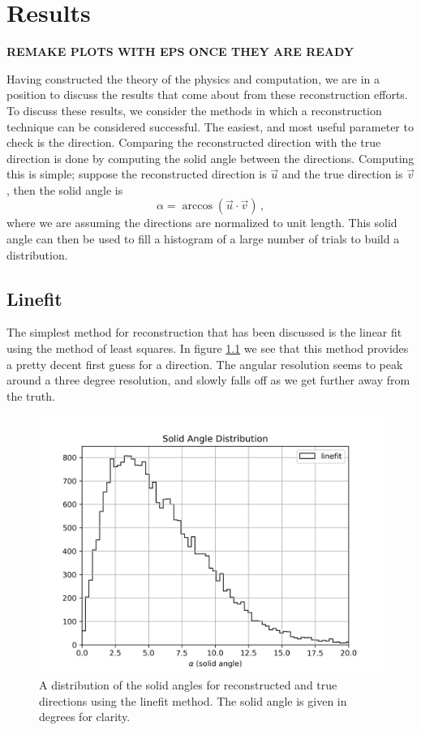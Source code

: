 \chapter{Results}

\textbf{REMAKE PLOTS WITH EPS ONCE THEY ARE READY}

Having constructed the theory of the physics and computation, we are in a position to discuss the results that come about from these reconstruction efforts. To discuss these results, we consider the methods in which a reconstruction technique can be considered successful. The easiest, and most useful parameter to check is the direction. Comparing the reconstructed direction with the true direction is done by computing the solid angle between the directions. Computing this is simple; suppose the reconstructed direction is $\vec{u}$ and the true direction is $\vec{v}$, then the solid angle is
\begin{equation}
  \alpha = \arccos(\vec{u}\cdot\vec{v})\, ,
\end{equation}
where we are assuming the directions are normalized to unit length. This solid angle can then be used to fill a histogram of a large number of trials to build a distribution. 

\section{Linefit}

The simplest method for reconstruction that has been discussed is the linear fit using the method of least squares. In figure \ref{fig:alpha_linefit} we see that this method provides a pretty decent first guess for a direction. The angular resolution seems to peak around a three degree resolution, and slowly falls off as we get further away from the truth. 

\begin{figure}[H]
  \centering
  \includegraphics[width=12cm]{./Figures/reco_plots/alpha_dist_linefit_count.png}
  \caption{A distribution of the solid angles for reconstructed and true directions using the linefit method. The solid angle is given in degrees for clarity.}
  \label{fig:alpha_linefit}
\end{figure}

